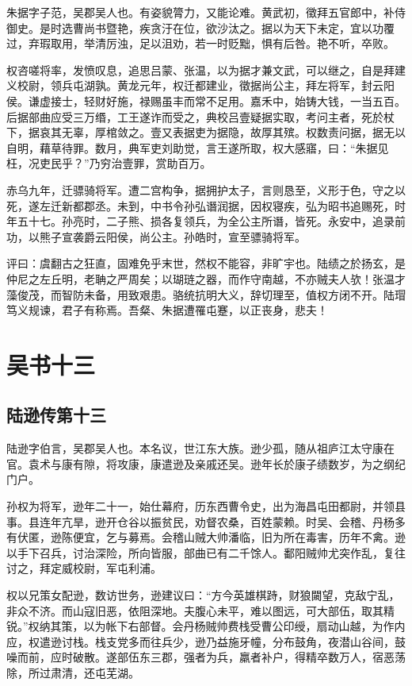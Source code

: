 \documentclass[12pt,UTF8]{ctexbook}
\begin{document}
朱据字子范，吴郡吴人也。有姿貌膂力，又能论难。黄武初，徵拜五官郎中，补侍御史。是时选曹尚书暨艳，疾贪汙在位，欲沙汰之。据以为天下未定，宜以功覆过，弃瑕取用，举清厉浊，足以沮劝，若一时贬黜，惧有后咎。艳不听，卒败。

权咨嗟将率，发愤叹息，追思吕蒙、张温，以为据才兼文武，可以继之，自是拜建义校尉，领兵屯湖孰。黄龙元年，权迁都建业，徵据尚公主，拜左将军，封云阳侯。谦虚接士，轻财好施，禄赐虽丰而常不足用。嘉禾中，始铸大钱，一当五百。后据部曲应受三万缗，工王遂诈而受之，典校吕壹疑据实取，考问主者，死於杖下，据哀其无辜，厚棺敛之。壹又表据吏为据隐，故厚其殡。权数责问据，据无以自明，藉草待罪。数月，典军吏刘助觉，言王遂所取，权大感寤，曰：“朱据见枉，况吏民乎？”乃穷治壹罪，赏助百万。

赤乌九年，迁骠骑将军。遭二宫构争，据拥护太子，言则恳至，义形于色，守之以死，遂左迁新都郡丞。未到，中书令孙弘谮润据，因权寝疾，弘为昭书追赐死，时年五十七。孙亮时，二子熊、损各复领兵，为全公主所谮，皆死。永安中，追录前功，以熊子宣袭爵云阳侯，尚公主。孙皓时，宣至骠骑将军。

评曰：虞翻古之狂直，固难免乎末世，然权不能容，非旷宇也。陆绩之於扬玄，是仲尼之左丘明，老聃之严周矣；以瑚琏之器，而作守南越，不亦贼夫人欤！张温才藻俊茂，而智防未备，用致艰患。骆统抗明大义，辞切理至，值权方闭不开。陆瑁笃义规谏，君子有称焉。吾粲、朱据遭罹屯蹇，以正丧身，悲夫！

\part{吴书十三}
\chapter{陆逊传第十三}

陆逊字伯言，吴郡吴人也。本名议，世江东大族。逊少孤，随从祖庐江太守康在官。袁术与康有隙，将攻康，康遣逊及亲戚还吴。逊年长於康子绩数岁，为之纲纪门户。

孙权为将军，逊年二十一，始仕幕府，历东西曹令史，出为海昌屯田都尉，并领县事。县连年亢旱，逊开仓谷以振贫民，劝督农桑，百姓蒙赖。时吴、会稽、丹杨多有伏匿，逊陈便宜，乞与募焉。会稽山贼大帅潘临，旧为所在毒害，历年不禽。逊以手下召兵，讨治深险，所向皆服，部曲已有二千馀人。鄱阳贼帅尤突作乱，复往讨之，拜定威校尉，军屯利浦。

权以兄策女配逊，数访世务，逊建议曰：“方今英雄棋跱，财狼闚望，克敌宁乱，非众不济。而山寇旧恶，依阻深地。夫腹心未平，难以图远，可大部伍，取其精锐。”权纳其策，以为帐下右部督。会丹杨贼帅费栈受曹公印绶，扇动山越，为作内应，权遣逊讨栈。栈支党多而往兵少，逊乃益施牙幢，分布鼓角，夜潜山谷间，鼓噪而前，应时破散。遂部伍东三郡，强者为兵，羸者补户，得精卒数万人，宿恶荡除，所过肃清，还屯芜湖。
\end{document}
